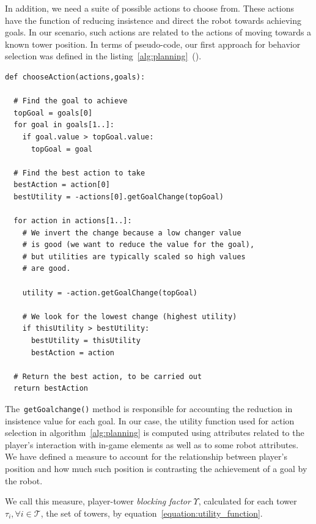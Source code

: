 In addition, we need a suite of possible actions to choose from. These actions have the function of reducing insistence and direct the robot towards achieving goals. In our scenario, such actions are related to the actions of moving towards a known tower position. In terms of pseudo-code, our first approach for behavior selection was defined in the listing~\ref{alg:planning}~(\cite{millington_artificial_2009}).

\begin{lstlisting}[basicstyle=\small, caption={A basic~\gls{gob} algorithm for action selection.}]
def chooseAction(actions,goals):

  # Find the goal to achieve    
  topGoal = goals[0]
  for goal in goals[1..]:
    if goal.value > topGoal.value:
      topGoal = goal
    	
  # Find the best action to take
  bestAction = action[0]
  bestUtility = -actions[0].getGoalChange(topGoal)

  for action in actions[1..]:
    # We invert the change because a low changer value 
    # is good (we want to reduce the value for the goal),
	# but utilities are typically scaled so high values 
	# are good.
    		
	utility = -action.getGoalChange(topGoal)
    		
    # We look for the lowest change (highest utility)
	if thisUtility > bestUtility:
	  bestUtility = thisUtility 
	  bestAction = action
    			
  # Return the best action, to be carried out
  return bestAction
\end{lstlisting}\label{alg:planning}

The~\verb|getGoalchange()| method is responsible for accounting the reduction in insistence value for each goal. In our case, the utility function used for action selection in algorithm~\ref{alg:planning} is computed using attributes related to the player's interaction with in-game elements as well as to some robot attributes. We have defined a measure to account for the relationship between player's position and how much such position is contrasting the achievement of a goal by the robot.

We call this measure, player-tower \textit{blocking factor} $\Upsilon$, calculated for each tower  $\tau_{i},\forall i \in \mathcal{T}$, the set of towers, by equation~\ref{equation:utility_function}. 

